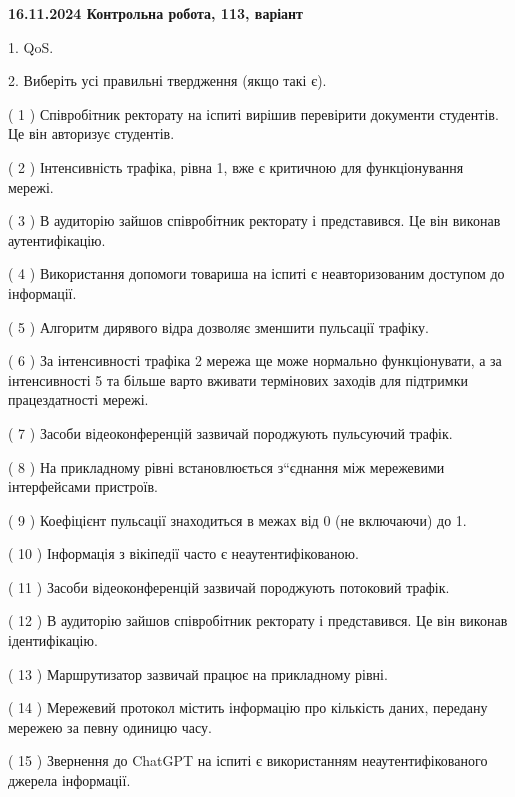 \documentclass[12pt, ukrainian]{article}
\begin{document}
\vspace{4mm}
\newpage
\begin {large}

\textbf{16.11.2024 Контрольна робота, 113, варіант  }\par


{
1. QoS.



\vspace{5mm}
2. Виберіть усі правильні твердження (якщо такі є).\par
\vspace{2mm}

( 1 ) Співробітник ректорату на іспиті вирішив перевірити документи студентів. Це він авторизує студентів.

( 2 ) Інтенсивність трафіка, рівна 1, вже є критичною для функціонування мережі.

( 3 ) В аудиторію зайшов співробітник ректорату і представився. Це він виконав аутентифікацію.

( 4 ) Використання допомоги товариша на іспиті є неавторизованим доступом до інформації.

( 5 ) Алгоритм дирявого відра дозволяє зменшити пульсації трафіку.

( 6 ) За інтенсивності трафіка 2 мережа ще може нормально функціонувати, а за інтенсивності 5 та більше варто вживати термінових заходів для підтримки працездатності мережі.

( 7 ) Засоби відеоконференцій зазвичай породжують пульсуючий трафік.

( 8 ) На прикладному рівні встановлюється з“єднання між мережевими інтерфейсами пристроїв.

( 9 ) Коефіцієнт пульсації знаходиться в межах від 0 (не включаючи) до 1.

( 10 ) Інформація з вікіпедії часто є неаутентифікованою.

( 11 ) Засоби відеоконференцій зазвичай породжують потоковий трафік.

( 12 ) В аудиторію зайшов співробітник ректорату і представився. Це він виконав ідентифікацію.

( 13 ) Маршрутизатор зазвичай працює на прикладному рівні.

( 14 ) Мережевий протокол містить інформацію про кількість даних, передану мережею за певну одиницю часу.

( 15 ) Звернення до ChatGPT на іспиті є використанням неаутентифікованого джерела інформації.
}
\end {large}
\end{document}
